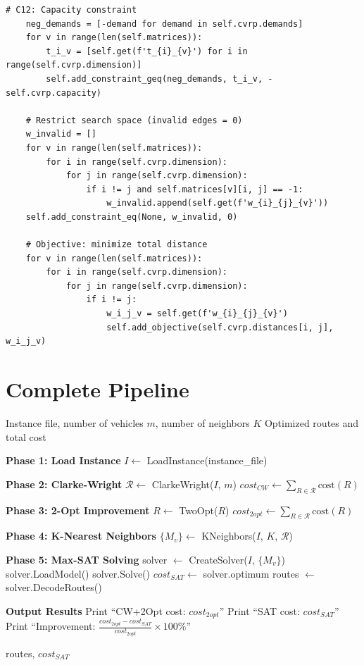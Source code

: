 \documentclass[12pt,a4paper]{article}
\theoremstyle{definition}
\begin{document}
\begin{lstlisting}[caption={Loading Model Constraints}]
    # C12: Capacity constraint
    neg_demands = [-demand for demand in self.cvrp.demands]
    for v in range(len(self.matrices)):
        t_i_v = [self.get(f't_{i}_{v}') for i in range(self.cvrp.dimension)]
        self.add_constraint_geq(neg_demands, t_i_v, -self.cvrp.capacity)
    
    # Restrict search space (invalid edges = 0)
    w_invalid = []
    for v in range(len(self.matrices)):
        for i in range(self.cvrp.dimension):
            for j in range(self.cvrp.dimension):
                if i != j and self.matrices[v][i, j] == -1:
                    w_invalid.append(self.get(f'w_{i}_{j}_{v}'))
    self.add_constraint_eq(None, w_invalid, 0)
    
    # Objective: minimize total distance
    for v in range(len(self.matrices)):
        for i in range(self.cvrp.dimension):
            for j in range(self.cvrp.dimension):
                if i != j:
                    w_i_j_v = self.get(f'w_{i}_{j}_{v}')
                    self.add_objective(self.cvrp.distances[i, j], w_i_j_v)
\end{lstlisting}

\section{Complete Pipeline}

\begin{algorithm}[H]
\caption{Complete CVRP Post-Improvement Pipeline}
\begin{algorithmic}[1]
\Require Instance file, number of vehicles $m$, number of neighbors $K$
\Ensure Optimized routes and total cost

\State \textbf{Phase 1: Load Instance}
\State $I \gets$ LoadInstance(instance\_file)

\State \textbf{Phase 2: Clarke-Wright}
\State $\mathcal{R} \gets$ ClarkeWright($I$, $m$)
\State $cost_{CW} \gets \sum_{R \in \mathcal{R}} \text{cost}(R)$

\State \textbf{Phase 3: 2-Opt Improvement}
    \State $R \gets$ TwoOpt($R$)
\EndFor
\State $cost_{2opt} \gets \sum_{R \in \mathcal{R}} \text{cost}(R)$

\State \textbf{Phase 4: K-Nearest Neighbors}
\State $\{M_v\} \gets$ KNeighbors($I$, $K$, $\mathcal{R}$)

\State \textbf{Phase 5: Max-SAT Solving}
\State solver $\gets$ CreateSolver($I$, $\{M_v\}$)
\State solver.LoadModel()
\State solver.Solve()
\State $cost_{SAT} \gets$ solver.optimum
\State routes $\gets$ solver.DecodeRoutes()

\State \textbf{Output Results}
\State Print ``CW+2Opt cost: $cost_{2opt}$''
\State Print ``SAT cost: $cost_{SAT}$''
\State Print ``Improvement: $\frac{cost_{2opt} - cost_{SAT}}{cost_{2opt}} \times 100\%$''

\State \Return routes, $cost_{SAT}$
\end{algorithmic}
\end{algorithm}
\end{document}

